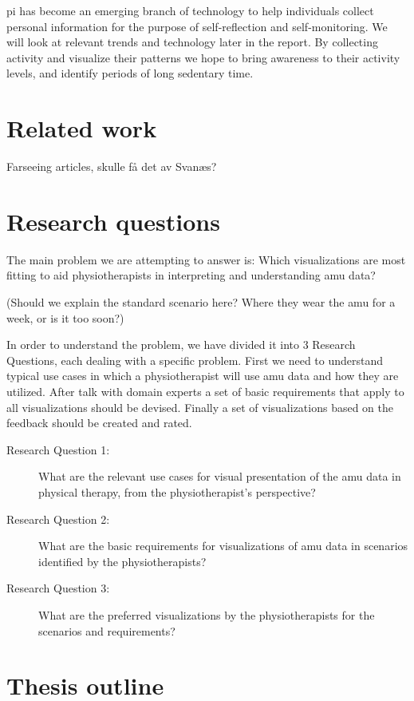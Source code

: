 \gls{pi} has become an emerging branch of technology to help individuals collect personal information for the purpose of self-reflection and self-monitoring. We will look at relevant trends and technology later in the report. By collecting activity and visualize their patterns we hope to bring awareness to their activity levels, and identify periods of long sedentary time. 

\section{Related work}
Farseeing articles, skulle få det av Svanæs?

\section{Research questions}
The main problem we are attempting to answer is: Which visualizations are most fitting to aid physiotherapists in interpreting and understanding \gls{amu} data?

(Should we explain the standard scenario here? Where they wear the \gls{amu} for a week, or is it too soon?)

In order to understand the problem, we have divided it into 3 Research Questions, each dealing with a specific problem. First we need to understand typical use cases in which a physiotherapist will use \gls{amu} data and how they are utilized. After talk with domain experts a set of basic requirements that apply to all visualizations should be devised. Finally a set of visualizations based on the feedback should be created and rated.

\begin{description}
\item[Research Question 1:] What are the relevant use cases for visual presentation of the \gls{amu} data in physical therapy, from the physiotherapist's perspective?

\item[Research Question 2:] What are the basic requirements for visualizations of \gls{amu} data in scenarios identified by the physiotherapists?

\item[Research Question 3:] What are the preferred visualizations by the physiotherapists for the scenarios and requirements?
\end{description}

\section{Thesis outline}
